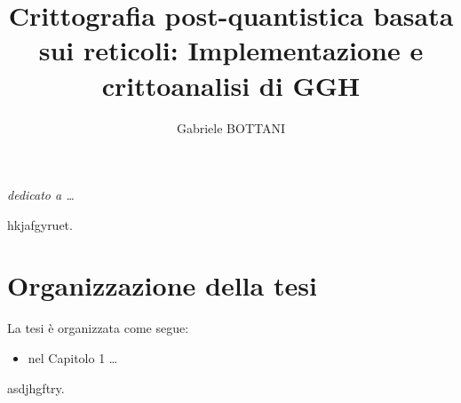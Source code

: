 \documentclass[a4paper,12pt]{report}
\theoremstyle{definition}
\begin{document}
\title{Crittografia post-quantistica basata sui reticoli: Implementazione e crittoanalisi di GGH}
\author{Gabriele BOTTANI}

% 
%
\beforepreface
\prefacesection{}
        {\hfill \Large {\sl dedicato a \dots}}

% 
%
hkjafgyruet.

%
%
\section*{Organizzazione della tesi}
\label{organizzazione}
La tesi \`e organizzata come segue:
\begin{itemize}
\item nel Capitolo 1 \dots
\end{itemize}
%
%
asdjhgftry.
\afterpreface
% 
% 

%

%
\end{document}

